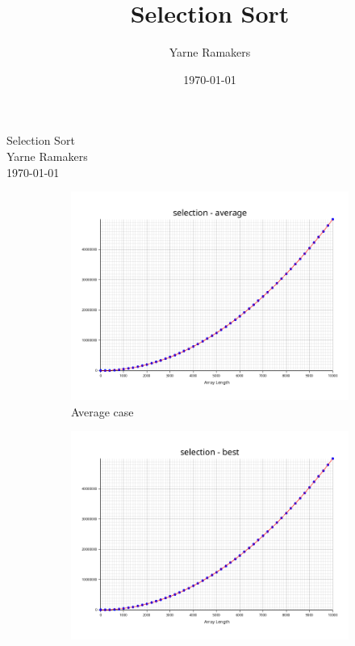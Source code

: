 \documentclass[a4paper]{article}
\title{Selection Sort}
\author{Yarne Ramakers}
\date{\today}
\begin{document}
\begin{center}
  Selection Sort \\
  Yarne Ramakers \\
  \today \\
\end{center}

\begin{figure}[h]
  \begin{subfigure}{0.3\textwidth}
    \includegraphics[width=\textwidth]{../plots/selection-average.png}
    \caption{Average case}
    \label{fig:selection-avg}
  \end{subfigure}
  \begin{subfigure}[b]{0.3\textwidth}
    \includegraphics[width=\textwidth]{../plots/selection-best.png}

\end{subfigure}
\end{figure}
\end{document}
